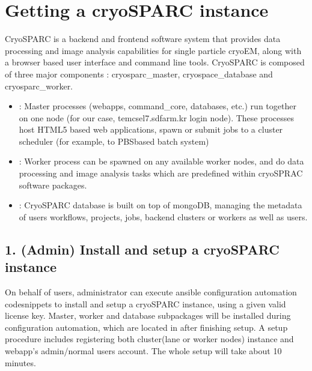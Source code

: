 \documentclass[a4paper,11pt,english]{sphinxmanual}
\begin{document}
\section{Getting a cryoSPARC instance}
\label{\detokenize{cryoSPARC:getting-a-cryosparc-instance}}
\sphinxAtStartPar
CryoSPARC is a backend and frontend software system that provides data processing and image analysis capabilities for single particle cryo\sphinxhyphen{}EM,
along with a browser based user interface and command line tools. CryoSPARC is composed of three major components : cryosparc\_master, cryospace\_database and cryosparc\_worker.
\begin{itemize}
\item {} 
\sphinxAtStartPar
{} : Master processes (webapps, command\_core, databases, etc.) run together on one node (for our case, tem\sphinxhyphen{}cs\sphinxhyphen{}el7.sdfarm.kr login node). These processes host HTML5 based web applications, spawn or submit jobs to a cluster scheduler (for example, to PBS\sphinxhyphen{}based batch system)

\item {} 
\sphinxAtStartPar
{} : Worker process can be spawned on any available worker nodes, and do data processing and image analysis tasks which are pre\sphinxhyphen{}defined within cryoSPRAC software packages.

\item {} 
\sphinxAtStartPar
{} : CryoSPARC database is built on top of mongoDB, managing the metadata of users workflows, projects, jobs, backend clusters or workers as well as users.

\end{itemize}


\subsection{1. (Admin) Install and setup a cryoSPARC instance}
\label{\detokenize{cryoSPARC:admin-install-and-setup-a-cryosparc-instance}}
\sphinxAtStartPar
On behalf of users, administrator can execute ansible configuration automation code\sphinxhyphen{}snippets to install and setup a cryoSPARC instance, using a given valid license key.
Master, worker and database sub\sphinxhyphen{}packages will be installed during configuration automation, which are located in  after finishing setup.
A setup procedure includes registering both cluster(lane or worker nodes) instance and webapp’s admin/normal users account.
The whole setup will take about 10 minutes.
\end{document}
